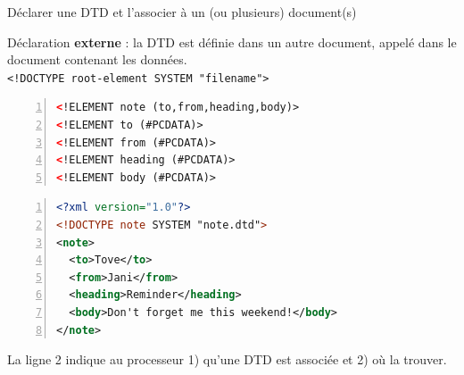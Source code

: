 \begin{frame}[containsverbatim]{Déclarer une DTD et l'associer à un (ou plusieurs) document(s)}

Déclaration \textbf{externe} : 
la DTD est définie dans un autre document, appelé dans le document contenant les données.\\
\verb?<!DOCTYPE root-element SYSTEM "filename">?

\begin{lstlisting}[basicstyle=\footnotesize, language=XML,breaklines=true,numbers=left, caption={DTD contenue dans le fichier note.dtd}]
<!ELEMENT note (to,from,heading,body)>
<!ELEMENT to (#PCDATA)>
<!ELEMENT from (#PCDATA)>
<!ELEMENT heading (#PCDATA)>
<!ELEMENT body (#PCDATA)>
\end{lstlisting}

\begin{lstlisting}[basicstyle=\footnotesize, language=XML,breaklines=true,numbers=left, caption={Déclaration externe, fichier appelant la DTD ci-dessus}]
<?xml version="1.0"?>
<!DOCTYPE note SYSTEM "note.dtd">
<note>
  <to>Tove</to>
  <from>Jani</from>
  <heading>Reminder</heading>
  <body>Don't forget me this weekend!</body>
</note>
\end{lstlisting}
La ligne 2 indique au processeur 1) qu'une DTD est associée et 2) où la trouver.


\end{frame}


